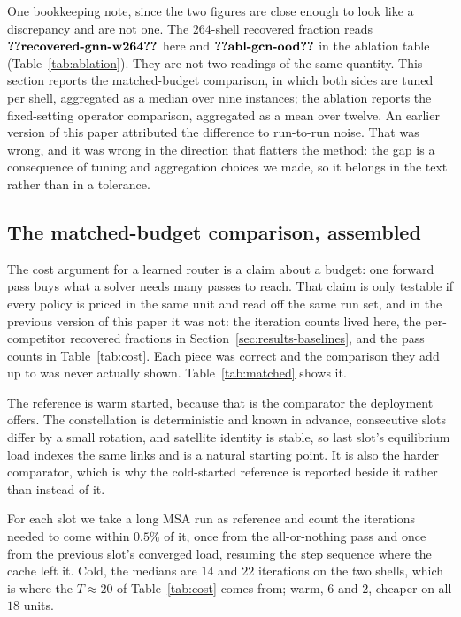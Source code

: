 \documentclass[journal]{IEEEtran}
\begin{document}
One bookkeeping note, since the two figures are close enough to look like a discrepancy and
are not one. The $264$-shell recovered fraction reads $\clm{recovered-gnn-w264}$ here and
$\clm{abl-gcn-ood}$ in the ablation table (Table~\ref{tab:ablation}). They are not two
readings of the same quantity. This section reports the matched-budget comparison, in which
both sides are tuned per shell, aggregated as a median over nine instances; the ablation
reports the fixed-setting operator comparison, aggregated as a mean over twelve. An earlier
version of this paper attributed the difference to run-to-run noise. That was wrong, and it
was wrong in the direction that flatters the method: the gap is a consequence of tuning and
aggregation choices we made, so it belongs in the text rather than in a tolerance.





\subsection{The matched-budget comparison, assembled}\label{sec:warmstart}
The cost argument for a learned router is a claim about a budget: one forward pass buys what a
solver needs many passes to reach. That claim is only testable if every policy is priced in the
same unit and read off the same run set, and in the previous version of this paper it was not:
the iteration counts lived here, the per-competitor recovered fractions in
Section~\ref{sec:results-baselines}, and the pass counts in Table~\ref{tab:cost}. Each piece was
correct and the comparison they add up to was never actually shown.
Table~\ref{tab:matched} shows it.

The reference is warm started, because that is the comparator the deployment offers. The
constellation is deterministic and known in advance, consecutive slots differ by a small
rotation, and satellite identity is stable, so last slot's equilibrium load indexes the same
links and is a natural starting point. It is also the harder comparator, which is why the
cold-started reference is reported beside it rather than instead of it.

For each slot we take a long MSA run as reference and count the iterations needed to come within $0.5\%$ of it, once from the all-or-nothing pass and once from the previous slot's converged load, resuming the step sequence where the cache left it. Cold, the medians are $14$ and $22$ iterations on the two shells, which is where the $T\approx 20$ of Table~\ref{tab:cost} comes from; warm, $6$ and $2$, cheaper on all $18$ units.
\end{document}
